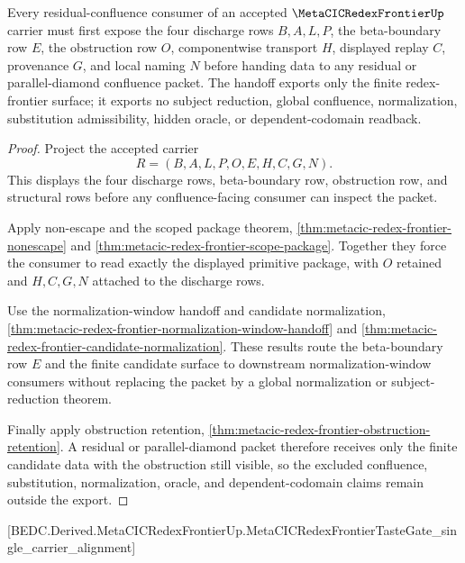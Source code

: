 \begin{theorem}
\label{thm:metacic-redex-frontier-residual-confluence-handoff}
Every residual-confluence consumer of an accepted
$\MetaCICRedexFrontierUp$ carrier must first expose the four discharge rows
$B,A,L,P$, the beta-boundary row $E$, the obstruction row $O$,
componentwise transport $H$, displayed replay $C$, provenance $G$, and local
naming $N$ before handing data to any residual or parallel-diamond confluence
packet. The handoff exports only the finite redex-frontier surface; it exports
no subject reduction, global confluence, normalization, substitution
admissibility, hidden oracle, or dependent-codomain readback.
\end{theorem}
\begin{proof}
Project the accepted carrier
$$
R=(B,A,L,P,O,E,H,C,G,N).
$$
This displays the four discharge rows, beta-boundary row, obstruction row, and
structural rows before any confluence-facing consumer can inspect the packet.

Apply non-escape and the scoped package theorem,
\autoref{thm:metacic-redex-frontier-nonescape} and
\autoref{thm:metacic-redex-frontier-scope-package}. Together they force the
consumer to read exactly the displayed primitive package, with $O$ retained and
$H,C,G,N$ attached to the discharge rows.

Use the normalization-window handoff and candidate normalization,
\autoref{thm:metacic-redex-frontier-normalization-window-handoff} and
\autoref{thm:metacic-redex-frontier-candidate-normalization}. These results
route the beta-boundary row $E$ and the finite candidate surface to downstream
normalization-window consumers without replacing the packet by a global
normalization or subject-reduction theorem.

Finally apply obstruction retention,
\autoref{thm:metacic-redex-frontier-obstruction-retention}. A residual or
parallel-diamond packet therefore receives only the finite candidate data with
the obstruction still visible, so the excluded confluence, substitution,
normalization, oracle, and dependent-codomain claims remain outside the export.
\end{proof}

[BEDC.Derived.MetaCICRedexFrontierUp.MetaCICRedexFrontierTasteGate\_single\_carrier\_alignment]

